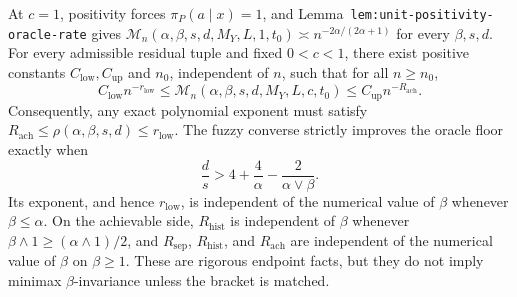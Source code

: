 At \(c=1\), positivity forces \(\pi_P(a\mid x)=1\), and Lemma~\texttt{lem:unit-positivity-oracle-rate} gives \(\mathcal M_n(\alpha,\beta,s,d,M_Y,L,1,t_0)\asymp n^{-2\alpha/(2\alpha+1)}\) for every \(\beta,s,d\). For every admissible residual tuple and fixed \(0<c<1\), there exist positive constants \(C_{\mathrm{low}},C_{\mathrm{up}}\) and \(n_0\), independent of \(n\), such that for all \(n\ge n_0\), \[ C_{\mathrm{low}}n^{-r_{\mathrm{low}}}\le \mathcal M_n(\alpha,\beta,s,d,M_Y,L,c,t_0)\le C_{\mathrm{up}}n^{-R_{\mathrm{ach}}}. \] Consequently, any exact polynomial exponent must satisfy \(R_{\mathrm{ach}}\le\rho(\alpha,\beta,s,d)\le r_{\mathrm{low}}\). The fuzzy converse strictly improves the oracle floor exactly when \[ \frac ds>4+\frac4\alpha-\frac{2}{\alpha\vee\beta}. \] Its exponent, and hence \(r_{\mathrm{low}}\), is independent of the numerical value of \(\beta\) whenever \(\beta\le\alpha\). On the achievable side, \(R_{\mathrm{hist}}\) is independent of \(\beta\) whenever \(\beta\wedge1\ge(\alpha\wedge1)/2\), and \(R_{\mathrm{sep}}\), \(R_{\mathrm{hist}}\), and \(R_{\mathrm{ach}}\) are independent of the numerical value of \(\beta\) on \(\beta\ge1\). These are rigorous endpoint facts, but they do not imply minimax \(\beta\)-invariance unless the bracket is matched.